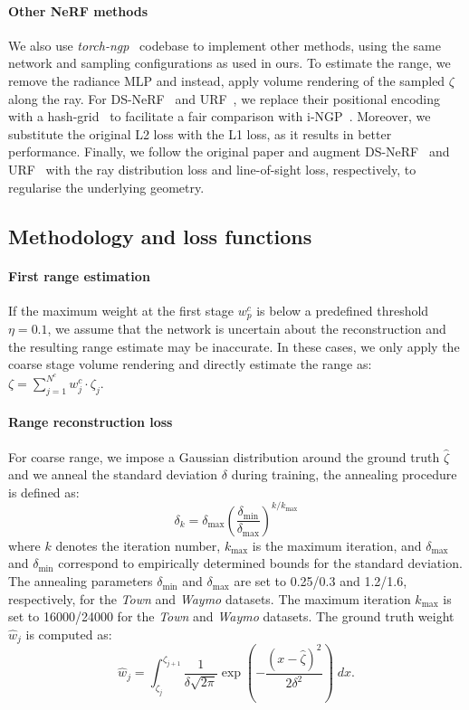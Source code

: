\paragraph{Other NeRF methods}
We also use \emph{torch-ngp}~\cite{torch-ngp} codebase to implement other methods, using the same network and sampling configurations as used in ours. To estimate the range, we remove the radiance MLP and instead, apply volume rendering of the sampled $\zeta$ along the ray.  For DS-NeRF~\cite{deng2021depth} and URF~\cite{rematas2021urban}, we replace their positional encoding with a hash-grid~\cite{muller2022instant} to facilitate a fair comparison with i-NGP~\cite{muller2022instant}. Moreover, we substitute the original L2 loss with the L1 loss, as it results in better performance. Finally, we follow the original paper and augment DS-NeRF~\cite{deng2021depth} and URF~\cite{rematas2021urban} with the ray distribution loss and line-of-sight loss, respectively, to regularise the underlying geometry. 


\subsection{Methodology and loss functions}
\label{sec:supp_method}
\paragraph{First range estimation}
If the maximum weight at the first stage $w_p^c$ is below a predefined threshold $\eta=0.1$, we assume that the network is uncertain about the reconstruction and the resulting range estimate may be inaccurate. In these cases, we only apply the coarse stage volume rendering and directly estimate the range as: $\zeta = \sum_{j=1}^{N^c} w_j^c \cdot \zeta_j$. 

\paragraph{Range reconstruction loss}
For coarse range, we impose a Gaussian distribution around the ground truth $\hat{\zeta}$ and we anneal the standard deviation $\delta$ during training, the annealing procedure is defined as:
\begin{equation}
    \delta_k = \delta_{\max} \left(\frac{\delta_{\min}}{\delta_{\max}}\right)^{k / k_{\max}}
\end{equation}
where $k$ denotes the iteration number, $k_{\max}$ is the maximum iteration, and $\delta_{\max}$ and $\delta_{\min}$ correspond to empirically determined bounds for the standard deviation. The annealing parameters $\delta_{\min}$ and $\delta_{\max}$ are set to 0.25/0.3 and 1.2/1.6, respectively, for the \textit{Town} and \textit{Waymo} datasets. The maximum iteration $k_{\max}$ is set to 16000/24000 for the \textit{Town} and \textit{Waymo} datasets. 
The ground truth weight $\hat{w}_j$ is computed as:
\begin{equation}
    \hat{w}_j = \int_{\zeta_j}^{\zeta_{j+1}} \frac{1}{\delta\sqrt{2\pi}}\exp\left(-\frac{(x - \hat{\zeta})^2}{2\delta^2}\right) \; dx.
\end{equation}


